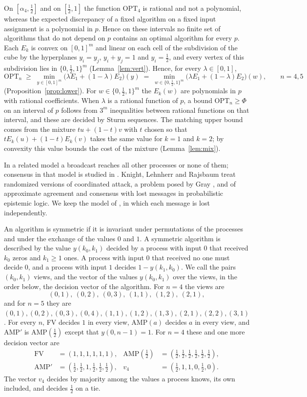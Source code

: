 \documentclass[11pt]{article}
\newcommand{\OPT}{\mathrm{OPT}}
\newcommand{\h}{\tfrac12}
\begin{document}
On $[\alpha_4,\h]$ and on $[\h,1]$ the function $\OPT_4$ is rational and not a polynomial, whereas the expected discrepancy of a fixed algorithm on a fixed input assignment is a polynomial in $p$. Hence on these intervals no finite set of algorithms that do not depend on $p$ contains an optimal algorithm for every $p$. Each $E_k$ is convex on $[0,1]^m$ and linear on each cell of the subdivision of the cube by the hyperplanes $y_i=y_j$, $y_i+y_j=1$ and $y_i=\h$, and every vertex of this subdivision lies in $\{0,\h,1\}^m$ (Lemma~\ref{lem:vert}). Hence, for every $\lambda\in[0,1]$,
\[
\OPT_n\;\ge\;\min_{y\in[0,1]^m}\bigl(\lambda E_1+(1-\lambda)E_2\bigr)(y)\;=\;\min_{w\in\{0,\h,1\}^m}\bigl(\lambda E_1+(1-\lambda)E_2\bigr)(w),\qquad n=4,5
\]
(Proposition~\ref{prop:lower}). For $w\in\{0,\h,1\}^m$ the $E_k(w)$ are polynomials in $p$ with rational coefficients. When $\lambda$ is a rational function of $p$, a bound $\OPT_n\ge\Phi$ on an interval of $p$ follows from $3^m$ inequalities between rational functions on that interval, and these are decided by Sturm sequences. The matching upper bound comes from the mixture $tu+(1-t)v$ with $t$ chosen so that $tE_k(u)+(1-t)E_k(v)$ takes the same value for $k=1$ and $k=2$; by convexity this value bounds the cost of the mixture (Lemma~\ref{lem:mix}).

In a related model a broadcast reaches all other processes or none of them; consensus in that model is studied in \cite{FPR26}. Knight, Lehnherr and Rajsbaum \cite{KLR26} treat randomized versions of coordinated attack, a problem posed by Gray \cite{Gray}, and of approximate agreement and consensus with lost messages in probabilistic epistemic logic. We keep the model of \cite{FPR}, in which each message is lost independently.

An algorithm is symmetric if it is invariant under permutations of the processes and under the exchange of the values $0$ and $1$. A symmetric algorithm is described by the value $y(k_0,k_1)$ decided by a process with input $0$ that received $k_0$ zeros and $k_1\ge1$ ones. A process with input $0$ that received no one must decide $0$, and a process with input $1$ decides $1-y(k_1,k_0)$. We call the pairs $(k_0,k_1)$ views, and the vector of the values $y(k_0,k_1)$ over the views, in the order below, the decision vector of the algorithm. For $n=4$ the views are
\[
(0,1),\ (0,2),\ (0,3),\ (1,1),\ (1,2),\ (2,1),
\]
and for $n=5$ they are $(0,1),(0,2),(0,3),(0,4),(1,1),(1,2),(1,3),(2,1),(2,2),(3,1)$. For every $n$, FV decides $1$ in every view, AMP$(a)$ decides $a$ in every view, and $\mathrm{AMP}'$ is AMP$(\h)$ except that $y(0,n-1)=1$. For $n=4$ these and one more decision vector are
\begin{align*}
\mathrm{FV}&=(1,1,1,1,1,1), & \mathrm{AMP}(\h)&=(\h,\h,\h,\h,\h,\h),\\
\mathrm{AMP}'&=(\h,\h,1,\h,\h,\h), & v_4&=(\h,1,1,0,\h,0).
\end{align*}
The vector $v_4$ decides by majority among the values a process knows, its own included, and decides $\h$ on a tie.
\end{document}
